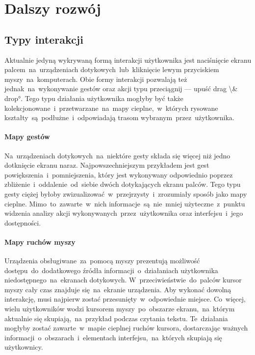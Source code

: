 \section{Dalszy rozwój}
\label{sec:future_work}

\subsection{Typy interakcji}
Aktualnie jedyną wykrywaną formą interakcji użytkownika jest naciśnięcie ekranu palcem~na~urządzeniach dotykowych~lub~kliknięcie lewym przyciskiem myszy~na~komputerach. Obie formy interakcji pozwalają też jednak~na~wykonywanie gestów oraz akcji typu przeciągnij --- upuść \ang{drag \& drop}. Tego typu działania użytkownika mogłyby być także kolekcjonowane~i~przetwarzane~na~mapy cieplne,~w~których rysowane kształty~są~podłużne~i~odpowiadają trasom wybranym~przez~użytkownika.

\paragraph{Mapy gestów} Na~urządzeniach dotykowych~na~niektóre gesty składa się więcej niż jedno dotknięcie ekranu naraz. Najpowszechniejszym przykładem jest gest powiększenia~i~pomniejszenia, który jest wykonywany odpowiednio poprzez zbliżenie~i~oddalenie~od~siebie dwóch dotykających ekranu palców. Tego typu gesty ciężej byłoby zwizualizować~w~przejrzysty~i~zrozumiały sposób jako mapy cieplne. Mimo~to~zawarte~w~nich informacje~są~nie~mniej użyteczne~z~punktu widzenia analizy akcji wykonywanych~przez~użytkownika oraz interfejsu~i~jego dostępności.

\paragraph{Mapy ruchów myszy} Urządzenia obsługiwane~za~pomocą myszy prezentują możliwość dostępu~do~dodatkowego źródła informacji~o~działaniach użytkownika niedostępnego~na~ekranach dotykowych. W~przeciwieństwie~do~palców kursor myszy cały czas znajduje się~na~ekranie urządzenia. Aby wykonać dowolną interakcję, musi najpierw zostać przesunięty~w~odpowiednie miejsce. Co~więcej, wielu użytkowników wodzi kursorem myszy~po~obszarze ekranu,~na~którym aktualnie się skupiają,~na~przykład podczas czytania tekstu. Te~działania mogłyby zostać zawarte~w~mapie cieplnej ruchów kursora, dostarczając ważnych informacji~o~obszarach~i~elementach interfejsu,~na~których skupiają się użytkownicy.

